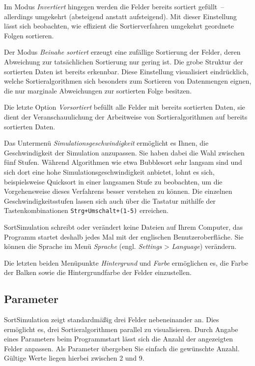 \documentclass[german]{pfBook}
\begin{document}
	Im Modus \emph{Invertiert} hingegen werden die Felder bereits sortiert gefüllt~-- allerdings umgekehrt (absteigend anstatt aufsteigend). Mit dieser Einstellung lässt sich beobachten, wie effizient die Sortierverfahren umgekehrt geordnete Folgen sortieren.
	
	Der Modus \emph{Beinahe sortiert} erzeugt eine zufällige Sortierung der Felder, deren Abweichung zur tatsächlichen Sortierung nur gering ist. Die grobe Struktur der sortierten Daten ist bereits erkennbar. Diese Einstellung visualisiert eindrücklich, welche Sortieralgorithmen sich besonders zum Sortieren von Datenmengen eignen, die nur marginale Abweichungen zur sortierten Folge besitzen.
	
	Die letzte Option \emph{Vorsortiert} befüllt alle Felder mit bereits sortierten Daten, sie dient der Veranschauulichung der Arbeitweise von Sortieralgorithmen auf bereits sortierten Daten.
	
	Das Untermenü \emph{Simulationsgeschwindigkeit} ermöglicht es Ihnen, die Geschwindigkeit der Simulation anzupassen. Sie haben dabei die Wahl zwischen fünf Stufen. Während Algorithmen wie etwa Bubblesort sehr langsam sind und sich dort eine hohe Simulationsgeschwindigkeit anbietet, lohnt es sich, beispielsweise Quicksort in einer langsamen Stufe zu beobachten, um die Vorgehensweise dieses Verfahrens besser verstehen zu können. Die einzelnen Geschwindigkeitsstufen lassen sich auch über die Tastatur mithilfe der Tastenkombinationen \texttt{Strg+Umschalt+(1-5)} erreichen.
	
	SortSimulation schreibt oder verändert keine Dateien auf Ihrem Computer, das Programm startet deshalb jedes Mal mit der englischen Benutzeroberfläche. Sie können die Sprache im Menü \emph{Sprache} (engl. \emph{Settings} > \emph{Language}) verändern.
	
	Die letzten beiden Menüpunkte \emph{Hintergrund} und \emph{Farbe} ermöglichen es, die Farbe der Balken sowie die Hintergrundfarbe der Felder einzustellen.
	
	\subsection{Parameter}
	\label{StartUpArguments}
	
	SortSimulation zeigt standardmäßig drei Felder nebeneinander an. Dies ermöglicht es, drei Sortieralgorithmen parallel zu visualisieren. Durch Angabe eines Parameters beim Programmstart lässt sich die Anzahl der angezeigten Felder anpassen. Als Parameter übergeben Sie einfach die gewünschte Anzahl. Gültige Werte liegen hierbei zwischen 2 und 9.
	
\end{document}
